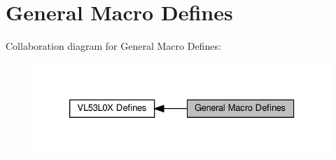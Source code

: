 \hypertarget{group__VL53L0X__define__GeneralMacro__group}{}\section{General Macro Defines}
\label{group__VL53L0X__define__GeneralMacro__group}
Collaboration diagram for General Macro Defines\+:\nopagebreak
\begin{figure}[H]
\begin{center}
\leavevmode
\includegraphics[width=326pt]{group__VL53L0X__define__GeneralMacro__group}
\end{center}
\end{figure}

